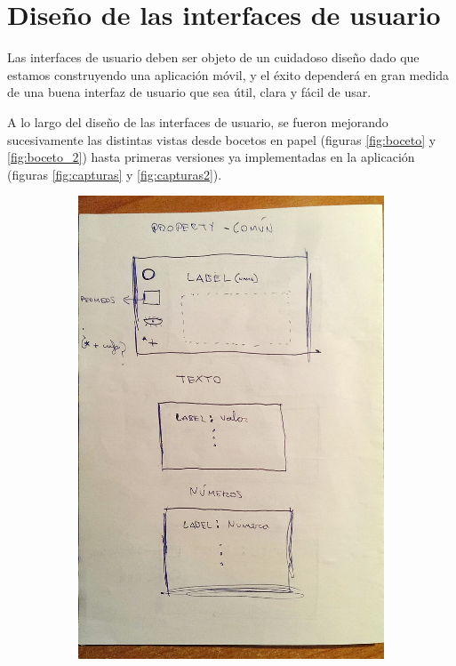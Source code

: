 \bigskip
\section{Diseño de las interfaces de usuario}

Las interfaces de usuario deben ser objeto de un cuidadoso diseño dado que estamos construyendo una aplicación móvil, y el éxito dependerá en gran medida de una buena interfaz de usuario que sea útil, clara y fácil de usar.

\bigskip
A lo largo del diseño de las interfaces de usuario, se fueron mejorando sucesivamente las distintas vistas desde bocetos en papel (figuras \ref{fig:boceto} y \ref{fig:boceto_2}) hasta primeras versiones ya implementadas en la aplicación (figuras \ref{fig:capturas} y \ref{fig:capturas2}).


\begin{figure}
    \centering
    \begin{subfigure}[]{0.45\textwidth}
        \includegraphics[width=\textwidth]{../images/boceto.jpg}

\end{subfigure}
\end{figure}
